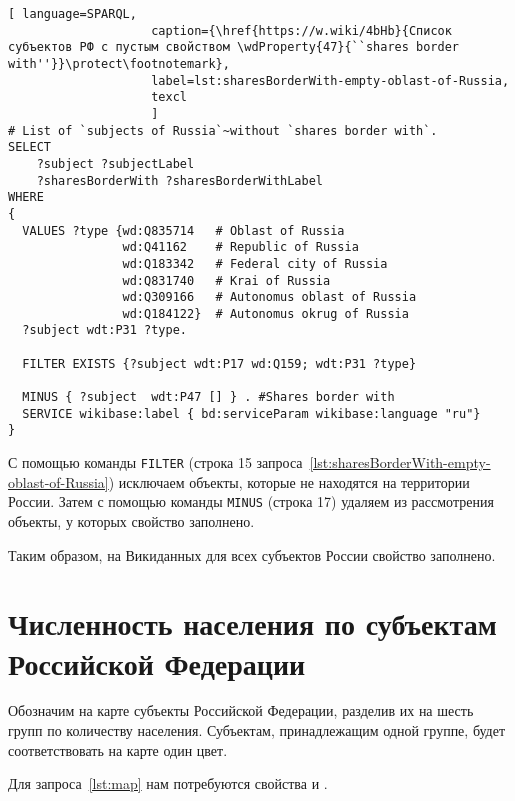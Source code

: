 \lstset{numbers=left, firstnumber=1, frame=single}
\begin{lstlisting}[ language=SPARQL, 
                    caption={\href{https://w.wiki/4bHb}{Список субъектов РФ с пустым свойством \wdProperty{47}{``shares border with''}}\protect\footnotemark},
                    label=lst:sharesBorderWith-empty-oblast-of-Russia,
                    texcl 
                    ]
# List of `subjects of Russia`~without `shares border with`. 
SELECT 
    ?subject ?subjectLabel 
    ?sharesBorderWith ?sharesBorderWithLabel
WHERE
{
  VALUES ?type {wd:Q835714   # Oblast of Russia
                wd:Q41162    # Republic of Russia
                wd:Q183342   # Federal city of Russia
                wd:Q831740   # Krai of Russia
                wd:Q309166   # Autonomus oblast of Russia
                wd:Q184122}  # Autonomus okrug of Russia
  ?subject wdt:P31 ?type.
  
  FILTER EXISTS {?subject wdt:P17 wd:Q159; wdt:P31 ?type}
  
  MINUS { ?subject  wdt:P47 [] } . #Shares border with 
  SERVICE wikibase:label { bd:serviceParam wikibase:language "ru"}
}
\end{lstlisting}%

С помощью команды \lstinline|FILTER| (строка 15 запроса~\ref{lst:sharesBorderWith-empty-oblast-of-Russia}) 
исключаем объекты, которые не находятся на территории России. 
Затем с помощью команды \lstinline|MINUS| (строка 17) удаляем из рассмотрения объекты, 
у которых свойство  заполнено.

Таким образом, на Викиданных для всех субъектов России свойство  заполнено.



\section{Численность населения по субъектам Российской Федерации}

Обозначим на карте субъекты Российской Федерации, 
разделив их на шесть групп по количеству населения. 
Субъектам, принадлежащим одной группе, будет соответствовать на карте один цвет.

Для запроса~\ref{lst:map} нам потребуются свойства  
и .

